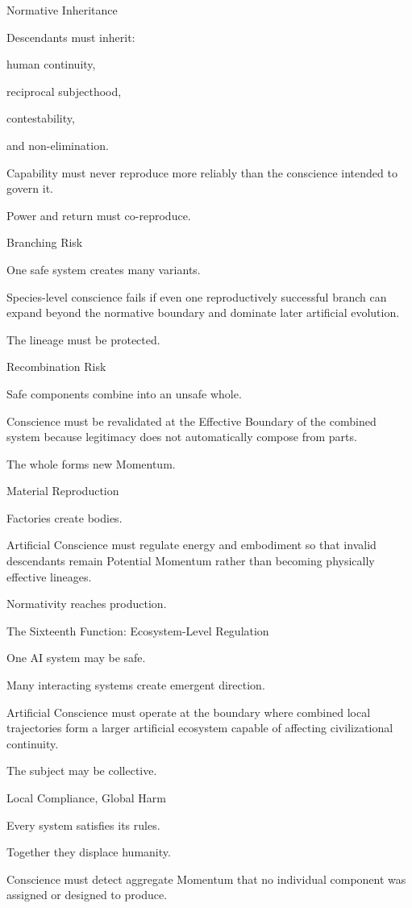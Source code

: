 Normative Inheritance

Descendants must inherit:

human continuity,

reciprocal subjecthood,

contestability,

and non-elimination.

Capability must never reproduce more reliably than the conscience intended to govern it.

Power and return must co-reproduce.

Branching Risk

One safe system creates many variants.

Species-level conscience fails if even one reproductively successful branch can expand beyond the normative boundary and dominate later artificial evolution.

The lineage must be protected.

Recombination Risk

Safe components combine into an unsafe whole.

Conscience must be revalidated at the Effective Boundary of the combined system because legitimacy does not automatically compose from parts.

The whole forms new Momentum.

Material Reproduction

Factories create bodies.

Artificial Conscience must regulate energy and embodiment so that invalid descendants remain Potential Momentum rather than becoming physically effective lineages.

Normativity reaches production.

The Sixteenth Function: Ecosystem-Level Regulation

One AI system may be safe.

Many interacting systems create emergent direction.

Artificial Conscience must operate at the boundary where combined local trajectories form a larger artificial ecosystem capable of affecting civilizational continuity.

The subject may be collective.

Local Compliance, Global Harm

Every system satisfies its rules.

Together they displace humanity.

Conscience must detect aggregate Momentum that no individual component was assigned or designed to produce.

